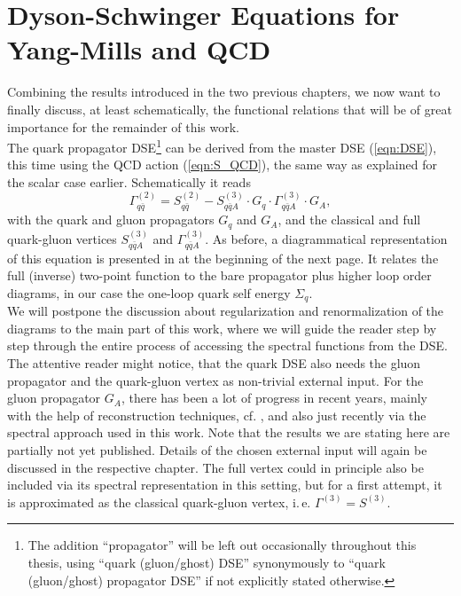 \section{Dyson-Schwinger Equations for Yang-Mills and QCD}\label{sec:ym_qcd_dse}
Combining the results introduced in the two previous chapters, we now want to finally discuss, at least schematically, the functional relations that will be of great importance for the remainder of this work.\\
The quark propagator DSE\footnote{The addition \enquote{propagator} will be left out occasionally throughout this thesis, using \enquote{quark (gluon/ghost) DSE} synonymously to \enquote{quark (gluon/ghost) propagator DSE} if not explicitly stated otherwise.} can be derived from the master DSE (\ref{eqn:DSE}), this time using the QCD action (\ref{eqn:S_QCD}), the same way as explained for the scalar case earlier. Schematically it reads
\begin{equation}
\Gamma_{q \bar{q}}^{(2)}=S_{q \bar{q}}^{(2)}-S_{q \bar{q} A}^{(3)} \cdot G_{q} \cdot \Gamma_{q \bar{q} A}^{(3)} \cdot G_{A},\label{eqn:quark_DSE}
\end{equation}
with the quark and gluon propagators $G_q$ and $G_A$, and the classical and full quark-gluon vertices $S_{q \bar{q} A}^{(3)}$ and $\Gamma_{q \bar{q} A}^{(3)}$. As before, a diagrammatical representation of this equation is presented in  at the beginning of the next page. It relates the full (inverse) two-point function to the bare propagator plus higher loop order diagrams, in our case the one-loop quark self energy $\Sigma_q$.\\
 We will postpone the discussion about regularization and renormalization of the diagrams to the main part of this work, where we will guide the reader step by step through the entire process of accessing the spectral functions from the DSE. \\
 The attentive reader might notice, that the quark DSE also needs the gluon propagator and the quark-gluon vertex as non-trivial external input. For the gluon propagator $G_A$, there has been a lot of progress in recent years, mainly with the help of reconstruction techniques, cf. \cite{Cyrol2017, CyrolMitterPawlowskiStrodthoff2017, CyrolPawlowskiRothkopWink2018}, and also just recently via the spectral approach used in this work. Note that the results we are stating here are partially not yet published. Details of the chosen external input will again be discussed in the respective chapter. 
The full vertex could in principle also be included via its spectral representation in this setting, but for a first attempt, it is approximated as the classical quark-gluon vertex, i.\,e. $\Gamma^{(3)} = S^{(3)}$.\\
